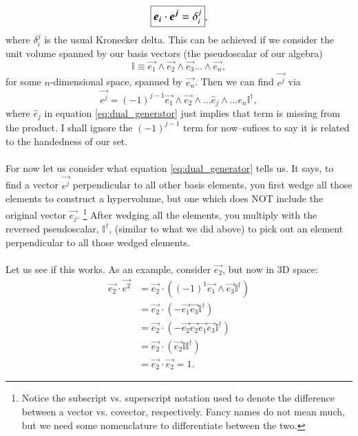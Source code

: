 \begin{equation} \label{eq:duality_definition}
    \large\boxed{\vec{e_i} \cdot \vec{e^j} = \delta_i^j},
\end{equation}
 where $ \delta_i^j$ is the usual Kronecker delta. This can be achieved if we consider the unit volume spanned by our basis vectors (the pseudoscalar of our algebra) 
\begin{equation}
    \mathbb{I} \equiv \vec{e_1} \wedge \vec{e_2} \wedge \vec{e_3} ... \wedge \vec{e_n},
\end{equation}
for some $n$-dimensional space, spanned by $\vec{e_n}$. Then we can find $\vec{e^j}$ via
\begin{equation}
    \label{eq:dual_generator}
    \vec{e^j} = (-1)^{j-1} \vec{e_1} \wedge \vec{e_2} \wedge ... \hat{e}_j \wedge ... e_{n} \mathbb{I}^\dagger,
\end{equation}
where $\hat{e}_j$ in equation \eqref{eq:dual_generator} just implies that term is missing from the product. I shall ignore the $(-1)^{j-1}$ term for now--sufices to say it is related to the handedness of our set. 
\\ \\ 
For now let us consider what equation \eqref{eq:dual_generator} tells us. It says, to find a vector $\vec{e^j}$ perpendicular to all other basis elements, you first wedge all those elements to construct a hypervolume, but one which does NOT include the original vector $\vec{e_j}$. \footnote{Notice the subscript vs. superscript notation used to denote the difference between a vector vs. covector, respectively. Fancy names do not mean much, but we need some nomenclature to differentiate between the two.} After wedging all the elements, you multiply with the reversed pseudoscalar, $\mathbb{I}^\dagger$, (similar to what we did above) to pick out an element perpendicular to all those wedged elements. 
\\ \\
Let us see if this works. As an example, consider $\vec{e_2}$, but now in 3D space:
\begin{align*}
    \vec{e_2} \cdot \vec{e^2} &= \vec{e_2} \cdot ((-1)^1 \vec{e_1} \wedge \vec{e_3} \mathbb{I}^\dagger ) \\
                    &= \vec{e_2} \cdot (-\vec{e_1} \vec{e_3} \mathbb{I}^\dagger )\\
                    &= \vec{e_2} \cdot (-\vec{e_2} \vec{e_2} \vec{e_1} \vec{e_3} \mathbb{I}^\dagger )\\
                    &= \vec{e_2} \cdot (\vec{e_2} \mathbb{I} \mathbb{I}^\dagger)\\
                    &= \vec{e_2} \cdot \vec{e_2} = 1.
\end{align*}

